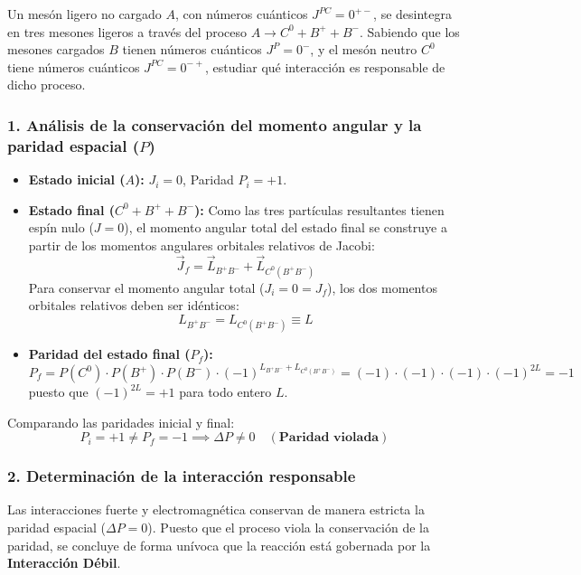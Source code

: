 \begin{problema}
Un mesón ligero no cargado $A$, con números cuánticos $J^{PC} = 0^{+-}$, se desintegra en tres mesones ligeros a través del proceso $A \rightarrow C^0 + B^+ + B^-$. Sabiendo que los mesones cargados $B$ tienen números cuánticos $J^P = 0^-$, y el mesón neutro $C^0$ tiene números cuánticos $J^{PC} = 0^{-+}$, estudiar qué interacción es responsable de dicho proceso.

\tcblower

\subsubsection*{1. Análisis de la conservación del momento angular y la paridad espacial ($P$)}

\begin{itemize}
    \item \textbf{Estado inicial ($A$):} $J_i = 0$, Paridad $P_i = +1$.
    \item \textbf{Estado final ($C^0 + B^+ + B^-$):} Como las tres partículas resultantes tienen espín nulo ($J=0$), el momento angular total del estado final se construye a partir de los momentos angulares orbitales relativos de Jacobi:
    \begin{equation*}
    \vec{J}_f = \vec{L}_{B^+ B^-} + \vec{L}_{C^0 (B^+ B^-)}
    \end{equation*}
    Para conservar el momento angular total ($J_i = 0 = J_f$), los dos momentos orbitales relativos deben ser idénticos:
    \begin{equation*}
    L_{B^+ B^-} = L_{C^0 (B^+ B^-)} \equiv L
    \end{equation*}

    \item \textbf{Paridad del estado final ($P_f$):}
    \begin{equation*}
    P_f = P(C^0) \cdot P(B^+) \cdot P(B^-) \cdot (-1)^{L_{B^+ B^-} + L_{C^0 (B^+ B^-)}} = (-1) \cdot (-1) \cdot (-1) \cdot (-1)^{2L} = -1
    \end{equation*}
    puesto que $(-1)^{2L} = +1$ para todo entero $L$.
\end{itemize}

Comparando las paridades inicial y final:
\begin{equation*}
P_i = +1 \neq P_f = -1 \implies \Delta P \neq 0 \quad (\textbf{Paridad violada})
\end{equation*}

\subsubsection*{2. Determinación de la interacción responsable}

Las interacciones fuerte y electromagnética conservan de manera estricta la paridad espacial ($\Delta P = 0$). Puesto que el proceso viola la conservación de la paridad, se concluye de forma unívoca que la reacción está gobernada por la \textbf{Interacción Débil}.
\end{problema}

